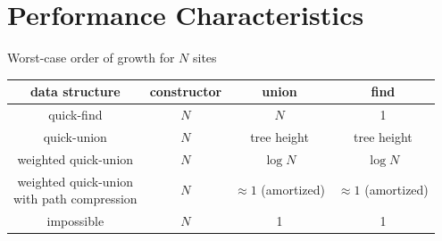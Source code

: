 \documentclass[8pt,a4paper,compress]{beamer}
\begin{document}
\section{Performance Characteristics}
\begin{frame}[fragile]
\pause

Worst-case order of growth for $N$ sites
\begin{center}
\begin{tabular}{cccc}
data structure & constructor & union & find \\ \hline
quick-find & $N$ & $N$ & 1 \\
quick-union & $N$ & tree height & tree height \\
weighted quick-union & $N$ & $\log N$ & $\log N$ \\
\makecell{weighted quick-union \\ with path compression} & $N$ & $\approx 1$ (amortized) & $\approx 1$ (amortized) \\
impossible & $N$ & 1 & 1
\end{tabular} 
\end{center}
\end{frame}
\end{document}
